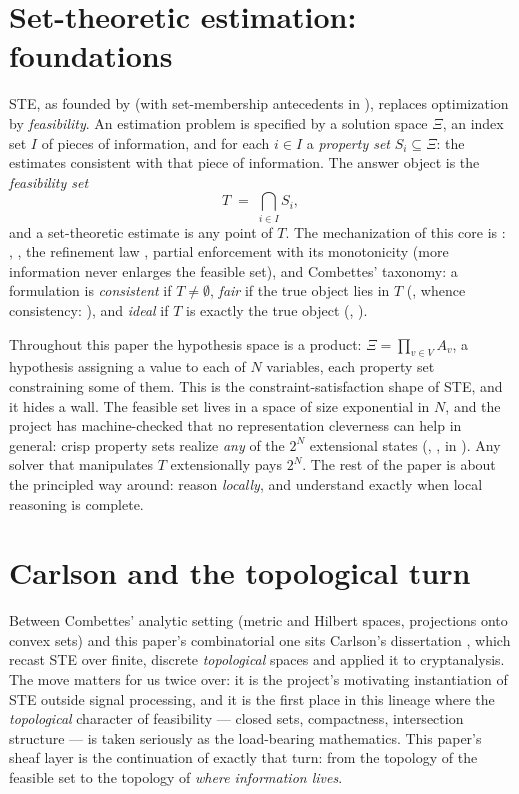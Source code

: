 \documentclass[11pt]{article}
\newcommand{\Hyp}{\Xi}
\begin{document}
\section{Set-theoretic estimation: foundations}
\label{sec:ste}

STE, as founded by \citet{combettes1993} (with set-membership
antecedents in \citealp{schweppe1968}), replaces optimization by
\emph{feasibility}.  An estimation problem is specified by a solution
space $\Hyp$, an index set $I$ of pieces of information, and for each
$i \in I$ a \emph{property set} $S_i \subseteq \Hyp$: the estimates
consistent with that piece of information.  The answer object is the
\emph{feasibility set}
\[
  T \;=\; \bigcap_{i \in I} S_i,
\]
and a set-theoretic estimate is any point of $T$.  The mechanization
of this core is : ,
, the refinement law
, partial enforcement
 with its monotonicity
 (more information never enlarges
the feasible set), and Combettes' taxonomy: a formulation is
\emph{consistent} if $T \ne \emptyset$, \emph{fair} if the true object
lies in $T$ (, whence consistency:
), and \emph{ideal} if $T$ is
exactly the true object (, ).

Throughout this paper the hypothesis space is a product: $\Hyp =
\prod_{v \in V} A_v$, a hypothesis assigning a value to each of $N$
variables, each property set constraining some of them.  This is the
constraint-satisfaction shape of STE, and it hides a wall.  The
feasible set lives in a space of size exponential in $N$, and the
project has machine-checked that no representation cleverness can
help in general: crisp property sets realize \emph{any} of the $2^N$
extensional states (,
, in
).  Any solver that manipulates
$T$ extensionally pays $2^N$.  The rest of the paper is about the
principled way around: reason \emph{locally}, and understand exactly
when local reasoning is complete.

\section{Carlson and the topological turn}
\label{sec:carlson}

Between Combettes' analytic setting (metric and Hilbert spaces,
projections onto convex sets) and this paper's combinatorial one sits
Carlson's dissertation \citep{carlson2012}, which recast STE over
finite, discrete \emph{topological} spaces and applied it to
cryptanalysis.  The move matters for us twice over: it is the
project's motivating instantiation of STE outside signal processing,
and it is the first place in this lineage where the \emph{topological}
character of feasibility --- closed sets, compactness, intersection
structure --- is taken seriously as the load-bearing mathematics.
This paper's sheaf layer is the continuation of exactly that turn:
from the topology of the feasible set to the topology of \emph{where
information lives}.
\end{document}
